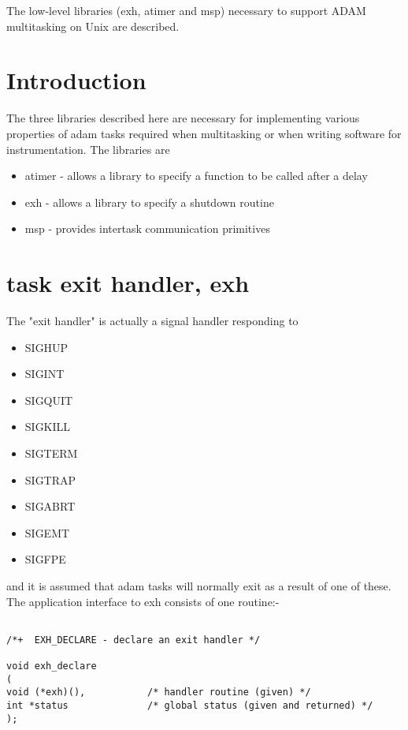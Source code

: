 The low-level libraries (exh, atimer and msp) necessary to support ADAM
multitasking on Unix are described.


\section {Introduction}

The three libraries described here are necessary for implementing various
properties of adam tasks required when multitasking or when writing
software for instrumentation. The libraries are

\begin{itemize}
\item atimer - allows a library to specify a function to be called after a delay
\item exh - allows a library to specify a shutdown routine
\item msp - provides intertask communication primitives
\end{itemize}


\section {task exit handler, exh}

The "exit handler" is actually a signal handler responding to 

\begin{itemize}
\item SIGHUP
\item SIGINT
\item SIGQUIT
\item SIGKILL
\item SIGTERM
\item SIGTRAP
\item SIGABRT
\item SIGEMT
\item SIGFPE
\end{itemize}

and it is assumed that adam tasks will normally exit as a result of one of
these. The application interface to exh consists of one routine:-
\begin{verbatim}

/*+  EXH_DECLARE - declare an exit handler */

void exh_declare
(
void (*exh)(),           /* handler routine (given) */
int *status              /* global status (given and returned) */
);

\end{verbatim}

